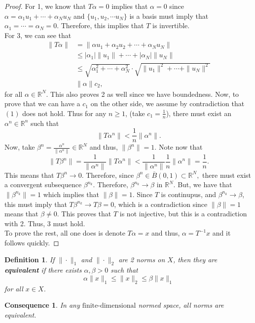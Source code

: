 \documentclass[oneside]{book}
\newtheorem{definition}{Definition}
\newtheorem{cons}{Consequence}
\newcommand{\R}{{\mathbb R}}
\newcommand{\fd}{{\text{finite-dimensional}}}
\newcommand{\sbs}{\subset}
\begin{document}
\begin{proof}
For 1, we know that $T\alpha = 0$ implies that $\alpha = 0$ since $\alpha = \alpha_1 u_1 + \cdots + \alpha_N u_N$ and $\{u_1, u_2, \cdots u_N\}$ is a basis must imply that $\alpha_1 = \cdots = \alpha_N = 0$. Therefore, this implies that $T$ is invertible. \\
For 3, we can see that 
\begin{align*}
\| T \alpha \| & = \| \alpha u_1 + \alpha_2  u_2 + \cdots + \alpha_N u_N \| \\
& \leq |\alpha_1| \| u_1 \| + \cdots + |\alpha_N| \| u_N \| \\
& \leq \sqrt{\alpha_1^2 + \cdots + \alpha_N^2} \cdot \sqrt{\| u_1 \|^2 + \cdots + \| u_N \|^2}\\
& \| \alpha \| c_2,
\end{align*}
for all $\alpha \in \R^N$. This also proves 2 as well since we have boundedness. Now, to prove that we can have a $c_1$ on the other side, we assume by contradiction that $(1)$ does not hold. Thus for any $n \geq 1$, (take $c_1 = \frac{1}{n}$), there must exist an $\alpha^n \in \R^n$ such that 
\[ \| T \alpha^n \| < \frac{1}{n} \| \alpha^n \|.\]
Now, take $\beta^n = \frac{\alpha^n}{\| \alpha^n \|} \in \R^N$ and thus, $\| \beta^n \| = 1$. Note now that 
\[ \| T \beta^n \| = \frac{1}{\| \alpha^n \| } \| T \alpha^n \| < \frac{1}{\| \alpha^n \|} \frac{1}{n} \| \alpha^n \| = \frac{1}{n}.\]
This means that $T \beta^n \to 0$. Therefore, since $\beta^n \in \overline{B}(0, 1) \sbs \R^N,$ there must exist a convergent subsequence $\beta^{n_k}$. Therefore, $\beta^{n_k} \to \beta$ in $\R^N$. But, we have that $\| \beta^{n_k} \| = 1$ which implies that $\| \beta \| = 1$. Since $T$ is continupus, and $\beta^{n_k} \to \beta$, this must imply that $T\beta^{n_k} \to T \beta = 0$, which is a contradiction since $\| \beta \| = 1$ means that $\beta \neq 0$. This proves that $T$ is not injective, but this is a contradiction with 2. Thus, 3 must hold. \\
To prove the rest, all one does is denote $T\alpha = x$ and thus, $\alpha = T^{-1} x$ and it follows quickly. 
\end{proof}
\begin{definition}
If $\| \cdot \|_1$ and $\| \cdot \|_2$ are 2 norms on $X$, then they are \textbf{equivalent} if there exists $\alpha, \beta > 0$ such that
\[ \alpha \| x \|_1 \leq \| x \|_2 \leq \beta \| x \|_1\]
for all $x\in X$. 
\end{definition}
\begin{cons}
In any $\fd$ normed space, all norms are equivalent.
\end{cons}
\end{document}
